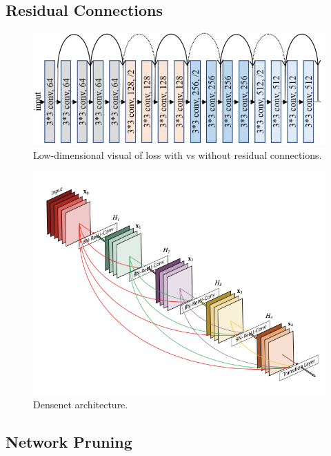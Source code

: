 \documentclass{article}
\begin{document}
\subsection{Residual Connections} 

  \begin{figure}[H]
    \centering 
    \includegraphics[scale=0.4]{img/resnet_loss.png}
    \caption{Low-dimensional visual of loss with vs without residual connections. } 
    \label{fig:resnet_loss}
  \end{figure}

  \begin{figure}[H]
    \centering 
    \includegraphics[scale=0.4]{img/densenet.png}
    \caption{Densenet architecture. } 
    \label{fig:densenet_architecture}
  \end{figure}

\subsection{Network Pruning}
\end{document}
